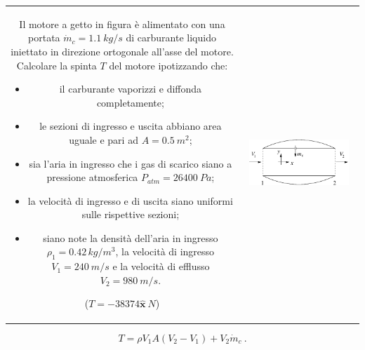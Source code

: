 \noindent
\begin{tabular}{cc}
\begin{minipage}{0.60\textwidth}
\begin{exerciseS}
    Il motore a getto in figura è alimentato con una portata $\dot{m}_c = 
1.1\ kg/s$ di carburante liquido iniettato in direzione 
ortogonale all'asse del motore. Calcolare la spinta $T$ del 
motore ipotizzando che:
\begin{itemize}
\item il carburante vaporizzi e diffonda completamente;
\item le sezioni di ingresso e uscita abbiano area uguale e pari 
      ad $A = 0.5\ m^2$;
\item sia l'aria in ingresso che i gas di scarico siano a pressione 
    atmosferica $P_{atm}=26400\ Pa$;
\item la velocità di ingresso e di uscita siano uniformi sulle 
      rispettive sezioni;
\item siano note la densità dell'aria in ingresso $\rho_1 = 0.42\, 
      kg/m^3$, la velocità di ingresso $V_1 = 240\ m/s$ 
      e la velocità di efflusso $V_2 = 980\ m/s$.
\end{itemize}
($T = -38374\hat{\bm{x}}\ N$)
\end{exerciseS}
\end{minipage}
&
\begin{minipage}{0.35\textwidth}
   \begin{center}
   \includegraphics[width=0.90\textwidth]{./fig/motore_a_getto.eps}
   \end{center}
\end{minipage}
\end{tabular}

\sol
\begin{equation}
    T = \rho V_1 A (V_2-V_1) + V_2 \dot{m}_c \ .
\end{equation}

